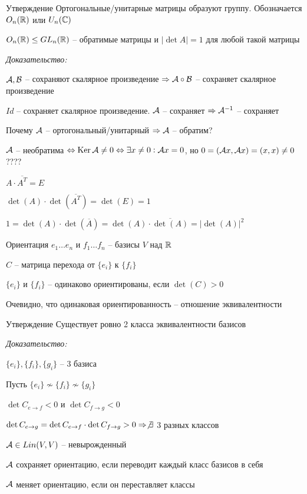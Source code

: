 \documentclass[12pt]{article}
\begin{document}
\begin{theo}{Утверждение}
    Ортогональные/унитарные матрицы образуют группу. Обозначается $O_n(\mathbb R)$ или $U_n(\mathbb C)$

    $O_n(\mathbb R) \leq GL_n(\mathbb R)$ -- обратимые матрицы и $|\det A| = 1$ для любой такой матрицы 
\end{theo}

\textit{Доказательство:}

$\mathcal{A}, \mathcal{B}$ -- сохраняют скалярное произведение $\Rightarrow \mathcal{A} \circ \mathcal{B}$ -- сохраняет скалярное произведение

$Id$ -- сохраняет скалярное произведение. $\mathcal{A}$ -- сохраняет $\Rightarrow \mathcal{A}^{-1}$ -- сохраняет

Почему $\mathcal{A}$ -- ортогональный/унитарный $\Rightarrow \mathcal{A}$ -- обратим?

$\mathcal{A}$ -- необратима $\Leftrightarrow \operatorname{Ker} \mathcal{A} \neq 0 \Leftrightarrow \exists x \neq 0 : \mathcal{A} x = 0$, но $0 = (\mathcal{A} x, \mathcal{A} x) = (x, x) \neq 0$ ????

$A \cdot \overline{A^T} = E$

$\det(A) \cdot \det(\overline{A^T}) = \det(E) = 1$

$1 = \det(A) \cdot \det(\overline{A}) = \det(A) \cdot \overline{\det(A)} = |\det(A)|^2$

\begin{nota}{Ориентация}
    $e_1 \ldots e_n$ и $f_1 \ldots f_n$ -- базисы $V$ над $\mathbb R$

    $C$ -- матрица перехода от $\{e_i\}$ к $\{f_i\}$

    $\{e_i\}$ и $\{f_i\}$ -- одинаково ориентированы, если $\det(C) > 0$

    Очевидно, что одинаковая ориентированность -- отношение эквивалентности
\end{nota}

\begin{theo}{Утверждение}
    Существует ровно 2 класса эквивалентности базисов
\end{theo}

\textit{Доказательство:}

$\{e_i\}, \{f_i\}, \{g_i\}$ -- 3 базиса 

Пусть $\{e_i\} \not\sim \{f_i\} \not\sim \{g_i\}$

$\det C_{e \to f} < 0$ и $\det C_{f \to g} < 0$

$\det C_{e \to g} = \det C_{e \to f} \cdot \det C_{f \to g} > 0 \Rightarrow \not\exists$ 3 разных классов

\begin{defin}{}
    $\mathcal{A} \in Lin(V, V)$ -- невырожденный

    $\mathcal{A}$ сохраняет ориентацию, если переводит каждый класс базисов в себя 

    $\mathcal{A}$ меняет ориентацию, если он переставляет классы 
\end{defin}
\end{document}
